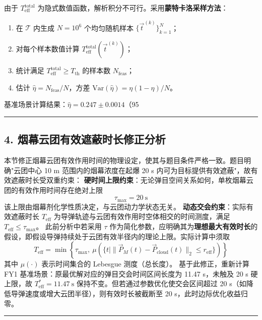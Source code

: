 \documentclass{JXUSTmodeling}
\begin{document}
由于 $T_{\mathrm{eff}}^{\mathrm{total}}$ 为隐式数值函数，解析积分不可行。采用\textbf{蒙特卡洛采样方法}：
\begin{enumerate}
  \item 在 $\mathcal{T}$ 内生成 $N = 10^6$ 个均匀随机样本 $\{\vec{t}^{(k)}\}_{k=1}^N$；
  \item 对每个样本数值计算 $T_{\mathrm{eff}}^{\mathrm{total}}(\vec{t}^{(k)})$；
  \item 统计满足 $T_{\mathrm{eff}}^{\mathrm{total}} \geq T_{\mathrm{th}}$ 的样本数 $N_{\mathrm{feas}}$；
  \item 估计 $\hat{\eta} = N_{\mathrm{feas}}/N$，方差 $\mathrm{Var}(\hat{\eta}) = \eta(1-\eta)/N$。
\end{enumerate}
基准场景计算结果：$\hat{\eta} = 0.247 \pm 0.0014$（95%
\noindent\rule{\textwidth}{0.4pt}
\subsection{4. 烟幕云团有效遮蔽时长修正分析}
本节修正烟幕云团有效作用时间的物理设定，使其与题目条件严格一致。题目明确"云团中心 10 m 范围内的烟幕浓度在起爆 20 s 内可为目标提供有效遮蔽"，故有效遮蔽时长受双重约束：
\textbf{硬时间上限约束}：无论弹目空间关系如何，单枚烟幕云团的有效作用时间存在绝对上限
\begin{equation}
\tau_{\max} = 20\ \mathrm{s} \tag{8.15}
\end{equation}
该上限由烟幕剂化学性质决定，与云团动力学状态无关。
\textbf{动态交会约束}：实际有效遮蔽时长 $T_{\mathrm{eff}}$ 为导弹轨迹与云团有效作用时空体相交的时间测度，满足 $T_{\mathrm{eff}} \leq \tau_{\max}$。
此前分析中若采用 $\tau$ 作为简化参数，应明确其为\textbf{理想最大有效时长}的假设，即假设导弹持续处于云团有效半径内的理论上限。实际计算中须取
\begin{equation}
T_{\mathrm{eff}} = \min\left\{\tau_{\max},\ \mu\left(\{t \mid \|\vec{P}_M(t) - \vec{P}_{\mathrm{cloud}}(t)\|_2 \leq r_{\mathrm{eff}}\}\right)\right\} \tag{8.16}
\end{equation}
其中 $\mu(\cdot)$ 表示时间集合的 Lebesgue 测度（总长度）。
基于此修正，重新计算 FY1 基准场景：原最优解对应的弹目交会时间区间长度为 11.47 s，未触及 20 s 硬上限，故 $T_{\mathrm{eff}}^* = 11.47\ \mathrm{s}$ 保持不变。但若通过参数优化使交会区间超过 20 s（如降低导弹速度或增大云团半径），则有效时长被截断至 20 s，此时边际优化收益归零。
\noindent\rule{\textwidth}{0.4pt}
\end{document}
